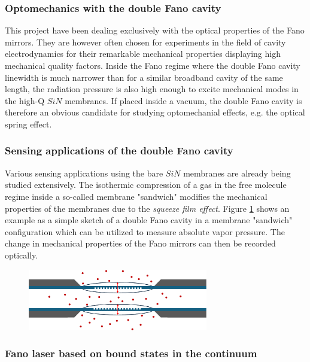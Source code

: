 \subsubsection{Optomechanics with the double Fano cavity}

This project have been dealing exclusively with the optical properties of the Fano mirrors. They are however often chosen for experiments in the field of cavity electrodynamics for their remarkable mechanical properties displaying high mechanical quality factors. Inside the Fano regime where the double Fano cavity linewidth is much narrower than for a similar broadband cavity of the same length, the radiation pressure is also high enough to excite mechanical modes in the high-Q $SiN$ membranes. If placed inside a vacuum, the double Fano cavity is therefore an obvious candidate for studying optomechanial effects, e.g. the optical spring effect\cite{Manjeshwar}.

\subsubsection{Sensing applications of the double Fano cavity}

Various sensing applications using the bare $SiN$ membranes are already being studied extensively. The isothermic compression of a gas in the free molecule regime inside a so-called membrane "sandwich" modifies the mechanical properties of the membranes due to the \emph{squeeze film effect}. Figure \ref{fig:squeeze_film_pressure_sensor_sketch} shows an example as a simple sketch of a double Fano cavity in a membrane "sandwich" configuration which can be utilized to measure absolute vapor pressure\cite{Salimi}. The change in mechanical properties of the Fano mirrors can then be recorded optically\cite{Al-Sumaidae,Hornig}. 

\begin{figure}[h!]
    \centering
    \includegraphics[width=0.7\textwidth]{figures/squeeze_film_pressure_sensor_sketch.pdf}
    \caption{}
    \label{fig:squeeze_film_pressure_sensor_sketch}
\end{figure}

\subsubsection{Fano laser based on bound states in the continuum}

